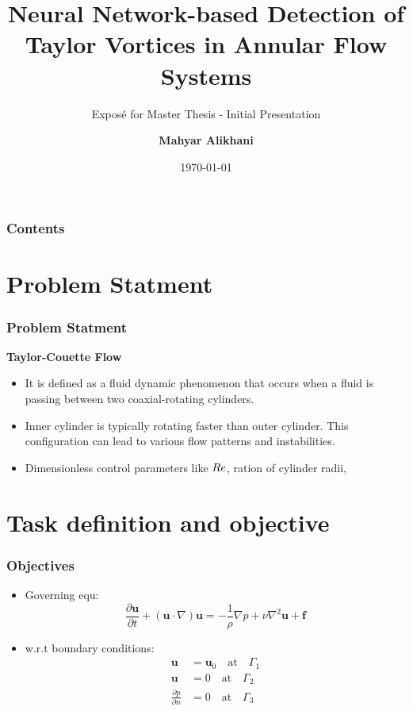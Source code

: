 \documentclass[aspectratio=169]{beamer}
\title{Neural Network-based Detection of Taylor Vortices in Annular Flow Systems}
\subtitle{Exposé for Master Thesis - Initial Presentation}
\author{\textbf{Mahyar Alikhani}}
\institute{Institute of Applied Mechanics}
\date{\today}
\begin{document}
\begin{frame}
\titlepage
\end{frame}

\begin{frame}
\frametitle{Contents}
\tableofcontents
\end{frame}

\section{Problem Statment}
\begin{frame}
  \frametitle{Problem Statment}
  \large \color{TUCgreen}\textbf{Taylor-Couette Flow}
  \begin{itemize}
    \item It is defined as a fluid dynamic phenomenon that occurs when a fluid is passing between two coaxial-rotating cylinders.
    \item Inner cylinder is typically rotating faster than outer cylinder. This configuration can lead to various flow patterns and instabilities.
    \item Dimensionless control parameters like \(\mathnormal{Re}\), ration of cylinder radii, 
  \end{itemize}
\end{frame}

\section{Task definition and objective}
\begin{frame}
  \frametitle{Objectives}
  \begin{itemize}
    \item Governing equ:\\
      \begin{equation}
        \frac{\partial \mathbf{u}}{\partial t} + (\mathbf{u} \cdot \nabla)\mathbf{u} = -\frac{1}{\rho}\nabla p + \nu \nabla^2 \mathbf{u} + \mathbf{f}
      \end{equation}
    \item w.r.t boundary conditions:\\
    \begin{align}
      \mathbf{u} &= \mathbf{u}_0 \quad \text{at} \quad \Gamma_1 \\
      \mathbf{u} &= 0 \quad \text{at} \quad \Gamma_2 \\
      \frac{\partial p}{\partial n} &= 0 \quad \text{at} \quad \Gamma_3
    \end{align}

  \end{itemize}
\end{frame}
\end{document}
